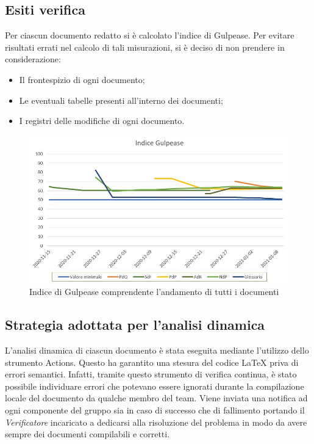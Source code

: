 \subsection{Esiti verifica}
Per ciascun documento redatto si è calcolato l'indice di Gulpease. Per evitare risultati errati nel calcolo di tali misurazioni, si è deciso di non prendere in considerazione:
\begin{itemize}
	\item Il frontespizio di ogni documento;
	\item Le eventuali tabelle presenti all'interno dei documenti;
	\item I registri delle modifiche di ogni documento.
\end{itemize}
\begin{figure}[ht]
	\centering
	\includegraphics[scale=0.6]{Immagini/Gulpease_v1.0}
	\caption{Indice di Gulpease comprendente l'andamento di tutti i documenti}
	\label{fig:gulpease}
\end{figure}
\newpage
\subsection{Strategia adottata per l'analisi dinamica}
L'analisi dinamica di ciascun documento è stata eseguita mediante l'utilizzo dello strumento  Actions. Questo ha garantito una stesura del codice \LaTeX{} priva di errori semantici. Infatti, tramite questo strumento di verifica continua, è stato possibile individuare errori che potevano essere ignorati durante la compilazione locale del documento da qualche membro del team. Viene inviata una notifica ad ogni componente del gruppo sia in caso di successo che di fallimento portando il \textit{Verificatore} incaricato a dedicarsi alla risoluzione del problema in modo da avere sempre dei documenti compilabili e corretti.